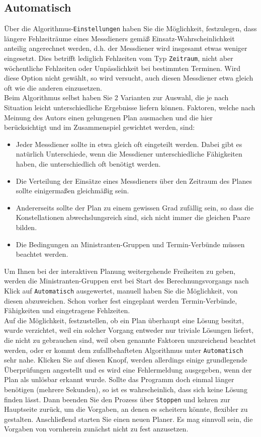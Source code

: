 \documentclass[a4paper,11pt]{article}
\begin{document}
\subsection{Automatisch}
Über die Algorithmus-\texttt{Einstellungen} haben Sie die Möglichkeit, festzulegen, dass längere Fehlzeiträume eines Messdieners gemäß Einsatz-Wahrscheinlichkeit anteilig angerechnet werden, d.h. der Messdiener wird insgesamt etwas weniger eingesetzt. Dies betrifft lediglich Fehlzeiten vom Typ \texttt{Zeitraum}, nicht aber wöchentliche Fehlzeiten oder Unpässlichkeit bei bestimmten Terminen. Wird diese Option nicht gewählt, so wird versucht, auch diesen Messdiener etwa gleich oft wie die anderen einzusetzen.\\
Beim Algorithmus selbst haben Sie 2 Varianten zur Auswahl, die je nach Situation leicht unterschiedliche Ergebnisse liefern können. Faktoren, welche nach Meinung des Autors einen gelungenen Plan ausmachen und die hier berücksichtigt und im Zusammenspiel gewichtet werden, sind:
\begin{itemize}
\item Jeder Messdiener sollte in etwa gleich oft eingeteilt werden. Dabei gibt es natürlich Unterschiede, wenn die Messdiener unterschiedliche Fähigkeiten haben, die unterschiedlich oft benötigt werden.
\item Die Verteilung der Einsätze eines Messdieners über den Zeitraum des Planes sollte einigermaßen gleichmäßig sein.
\item Andererseits sollte der Plan zu einem gewissen Grad zufällig sein, so dass die Konstellationen abwechslungsreich sind, sich nicht immer die gleichen Paare bilden.
\item Die Bedingungen an Ministranten-Gruppen und Termin-Verbünde müssen beachtet werden.
\end{itemize}
Um Ihnen bei der interaktiven Planung weitergehende Freiheiten zu geben, werden die Ministranten-Gruppen erst bei Start des Berechnungsvorgangs nach Klick auf \texttt{Automatisch} ausgewertet, manuell haben Sie die Möglichkeit, von diesen abzuweichen. Schon vorher fest eingeplant werden Termin-Verbünde, Fähigkeiten und eingetragene Fehlzeiten.\\
Auf die Möglichkeit, festzustellen, ob ein Plan überhaupt eine Lösung besitzt, wurde verzichtet, weil ein solcher Vorgang entweder nur triviale Lösungen liefert, die nicht zu gebrauchen sind, weil oben genannte Faktoren unzureichend beachtet werden, oder er kommt dem zufallbehafteten Algorithmus unter \texttt{Automatisch} sehr nahe. Klicken Sie auf diesen Knopf, werden allerdings einige grundlegende Überprüfungen angestellt und es wird eine Fehlermeldung ausgegeben, wenn der Plan als unlösbar erkannt wurde. Sollte das Programm doch einmal länger benötigen (mehrere Sekunden), so ist es wahrscheinlich, dass sich keine Lösung finden lässt. Dann beenden Sie den Prozess über \texttt{Stoppen} und kehren zur Hauptseite zurück, um die Vorgaben, an denen es scheitern könnte, flexibler zu gestalten. Anschließend starten Sie einen neuen Planer. Es mag sinnvoll sein, die Vorgaben von vornherein zunächst nicht zu fest anzusetzen.
\end{document}
